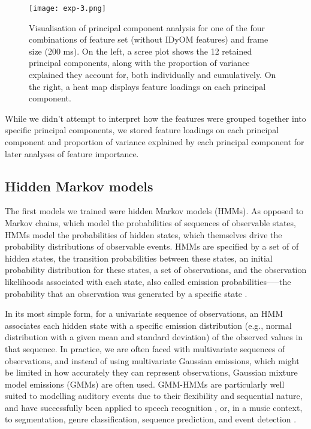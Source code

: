 \begin{figure}[t!]
\texttt{[image: exp-3.png]}
\centering
\caption{Visualisation of principal component analysis for one of the four combinations of feature set (without IDyOM features) and frame size (200 ms). On the left, a scree plot shows the 12 retained principal components, along with the proportion of variance explained they account for, both individually and cumulatively. On the right, a heat map displays feature loadings on each principal component.}
\label{fig:exp-3}
\end{figure}

While we didn't attempt to interpret how the features were grouped together into specific principal components, we stored feature loadings on each principal component and proportion of variance explained by each principal component for later analyses of feature importance.

\subsection{Hidden Markov models}

The first models we trained were hidden Markov models (HMMs). As opposed to Markov chains, which model the probabilities of sequences of observable states, HMMs model the probabilities of hidden states, which themselves drive the probability distributions of observable events. HMMs are specified by a set of of hidden states, the transition probabilities between these states, an initial probability distribution for these states, a set of observations, and the observation likelihoods associated with each state, also called emission probabilities–––the probability that an observation was generated by a specific state \parencite[for excellent introductions to HMMs, see][]{jurafsky2021,rabiner1989}.

In its most simple form, for a univariate sequence of observations, an HMM associates each hidden state with a specific emission distribution (e.g., normal distribution with a given mean and standard deviation) of the observed values in that sequence. In practice, we are often faced with multivariate sequences of observations, and instead of using multivariate Gaussian emissions, which might be limited in how accurately they can represent observations, Gaussian mixture model emissions (GMMs) are often used. GMM-HMMs are particularly well suited to modelling auditory events due to their flexibility and sequential nature, and have successfully been applied to speech recognition \parencite[see][]{juang1991}, or, in a music context, to segmentation, genre classification, sequence prediction, and event detection \parencite[e.g.,][]{ajmera2003,wang2019}.

